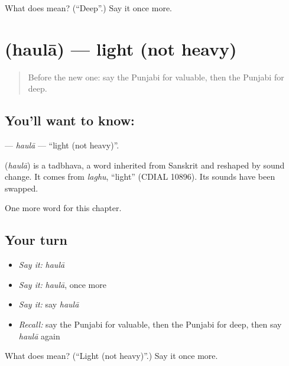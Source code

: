 \begin{tcolorbox}[breakable,colback=teal!4,colframe=teal!35!black,title={Before you move on}]
What does  mean? (\textquotedblleft{}Deep\textquotedblright{}.) Say it once more.
\end{tcolorbox}
\section[\texorpdfstring{\pa{ਹੌਲਾ} (haulā)}{ਹੌਲਾ (haulā)}]{ (haulā) — light (not heavy)}

\label{lesson:PA-C140-haula}



\begin{quote}
Before the new one: say the Punjabi for valuable, then the Punjabi for deep.
\end{quote}

\subsection*{You'll want to know: }
\textbf{} — \emph{haulā} — \textquotedblleft{}light (not heavy)\textquotedblright{}.

\begin{cousinweb}
\textbf{} (\emph{haulā}) is a tadbhava, a word inherited from Sanskrit and reshaped by sound change. It comes from \emph{laghu}, \textquotedblleft{}light\textquotedblright{} (CDIAL 10896). Its sounds have been swapped.
\end{cousinweb}

\begin{grammarlens}[title={What you've built}]
One more word for this chapter.
\end{grammarlens}

\subsection*{Your turn}
\begin{itemize}
\raggedright
  \item \emph{Say it:} \emph{haulā}
  \item \emph{Say it:} \emph{haulā}, once more
  \item \emph{Say it:} say \emph{haulā}
  \item \emph{Recall:} say the Punjabi for valuable, then the Punjabi for deep, then say \emph{haulā} again
\end{itemize}

\begin{tcolorbox}[breakable,colback=teal!4,colframe=teal!35!black,title={Before you move on}]
What does  mean? (\textquotedblleft{}Light (not heavy)\textquotedblright{}.) Say it once more.
\end{tcolorbox}
